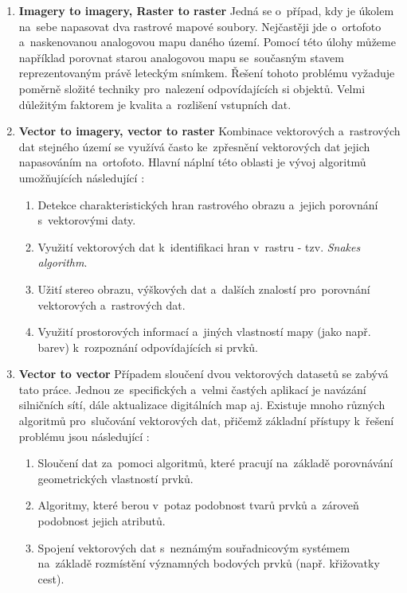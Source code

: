 \begin{enumerate}
  \item \textbf{Imagery to imagery, Raster to raster}
    \subitem Jedná se o~případ, kdy je úkolem na~sebe napasovat dva rastrové 
      mapové soubory. Nejčastěji jde o~ortofoto a~naskenovanou analogovou mapu
      daného území. Pomocí této úlohy můžeme například porovnat starou analogovou
      mapu se~současným stavem reprezentovaným právě leteckým snímkem. 
      Řešení tohoto problému vyžaduje poměrně složité techniky pro~nalezení 
      odpovídajících si objektů. Velmi důležitým faktorem je kvalita a~rozlišení
      vstupních dat.
  \item \textbf{Vector to imagery, vector to raster}
    \subitem Kombinace vektorových a~rastrových dat stejného území se využívá 
      často ke~zpřesnění vektorových dat jejich napasováním na~ortofoto. Hlavní
      náplní této oblasti je vývoj algoritmů umožňujících následující 
      \cite{gisencyclopedia}: 
	      \begin{enumerate}
	       \item Detekce charakteristických hran rastrového obrazu a~jejich 
		  porovnání s~vektorovými daty.
	       \item Využití vektorových dat k~identifikaci hran v~rastru - tzv. 
		  \textit{Snakes algorithm}.
	       \item Užití stereo obrazu, výškových dat a~dalších znalostí
		  pro~porovnání vektorových a~rastrových dat. 
	       \item Využití prostorových informací a~jiných vlastností mapy 
		  (jako např. barev) k~rozpoznání odpovídajících si prvků.
	      \end{enumerate}
  \item \textbf{Vector to vector} \nopagebreak
    \subitem Případem sloučení dvou vektorových datasetů se zabývá tato práce. 
	Jednou ze~specifických a~velmi častých aplikací je navázání silničních 
	sítí, dále aktualizace digitálních map aj. Existuje mnoho různých algoritmů
	pro~slučování vektorových dat, přičemž základní přístupy k~řešení problému 
	jsou následující \cite{gisencyclopedia}: 
	      \begin{enumerate}
	       \item Sloučení dat za~pomoci algoritmů, které pracují na~základě 
		  porovnávání geometrických vlastností prvků.
	       \item Algoritmy, které berou v~potaz podobnost tvarů prvků a~zároveň
		  podobnost jejich atributů.
	       \item Spojení vektorových dat s~neznámým souřadnicovým systémem 
		  na~základě rozmístění významných bodových prvků (např. křižovatky 
		  cest).
	      \end{enumerate}

\end{enumerate}

